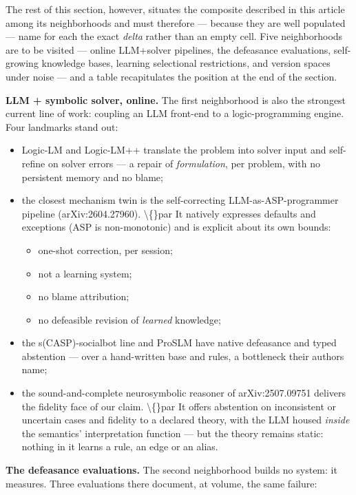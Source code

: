 \documentclass[11pt]{article}
\begin{document}
The rest of this section, however, situates the composite described in this article among its neighborhoods and must therefore — because they are well populated — name for each the exact \emph{delta} rather than an empty cell. Five neighborhoods are to be visited — online LLM+solver pipelines, the defeasance evaluations, self-growing knowledge bases, learning selectional restrictions, and version spaces under noise — and a table recapitulates the position at the end of the section.

\textbf{LLM + symbolic solver, online.} The first neighborhood is also the strongest current line of work: coupling an LLM front-end to a logic-programming engine. Four landmarks stand out:

\begin{itemize}
\item Logic-LM and Logic-LM++ translate the problem into solver input and self-refine on solver errors — a repair of \emph{formulation}, per problem, with no persistent memory and no blame;
\item the closest mechanism twin is the self-correcting LLM-as-ASP-programmer pipeline (arXiv:2604.27960). \textbackslash\{\}par It natively expresses defaults and exceptions (ASP is non-monotonic) and is explicit about its own bounds:

\begin{itemize}
\item one-shot correction, per session;
\item not a learning system;
\item no blame attribution;
\item no defeasible revision of \emph{learned} knowledge;

\end{itemize}
\item the s(CASP)-socialbot line and ProSLM have native defeasance and typed abstention — over a hand-written base and rules, a bottleneck their authors name;
\item the sound-and-complete neurosymbolic reasoner of arXiv:2507.09751 delivers the fidelity face of our claim. \textbackslash\{\}par It offers abstention on inconsistent or uncertain cases and fidelity to a declared theory, with the LLM housed \emph{inside} the semantics' interpretation function — but the theory remains static: nothing in it learns a rule, an edge or an alias.
\end{itemize}

\textbf{The defeasance evaluations.} The second neighborhood builds no system: it measures. Three evaluations there document, at volume, the same failure:
\end{document}
